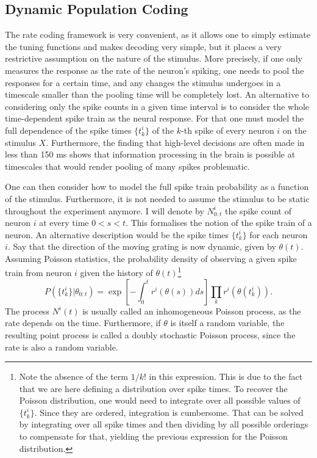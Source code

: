 \subsection{Dynamic Population Coding}

The rate coding framework is very convenient, as it allows one to simply estimate the tuning functions and makes decoding very simple, but it places a very restrictive
assumption on the nature of the stimulus. More precisely, if one only measures the response as the rate of the neuron's spiking, one needs to pool the responses for a 
certain time, and any changes the stimulus undergoes in a timescale smaller than the pooling time will be completely lost. An alternative to considering only the spike counts
in a given time interval is to consider the whole time-dependent spike train as the neural response. For that one must model the full dependence
of the spike times $\{t^i_k\}$ of the $k$-th spike of every neuron $i$ on the stimulus $X$. Furthermore, the finding that high-level decisions are often made in less than 
150 ms shows that information processing in the brain is possible at timescales that would render pooling of many spikes problematic.
\par

One can then consider how to model the full spike train probability as a function of the stimulus. Furthermore, it is not needed to assume the stimulus to be static
throughout the experiment anymore. I will denote by $N^i_{0:t}$ the spike count of neuron $i$ at every time $0 < s < t $. This formalises the notion of the spike train
of a neuron. An alternative description would be the spike times $\{t^i_k\}$ for each neuron $i$. Say that the direction of the moving grating is now dynamic, given
by $\theta(t)$. Assuming Poisson statistics, the probability density of observing a given spike train from neuron $i$ given the history of $\theta(t)$\footnote{Note the
absence of the term $1/k!$ in this expression. This is due to the fact that we are here defining a distribution over spike times. To recover the Poisson distribution, one
would need to integrate over all possible values of $\{t^i_k\}$. Since they are ordered, integration is cumbersome. That can be solved by integrating over all spike times
and then dividing by all possible orderings to compensate for that, yielding the previous expression for the Poisson distribution.}
\begin{equation}
\label{eq:poisson_prob}
P\left(\{t^i_k\}|\theta_{0:t}\right) = \exp\left[-\int_0^t r^i\left(\theta(s)\right) ds\right] \prod_k r^i\left(\theta(t^i_k)\right).
\end{equation}
The process $N^i(t)$ is usually called an inhomogeneous Poisson process, as the rate depends on the time. Furthermore, if $\theta$ is itself a random variable, the
resulting point process is called a doubly stochastic Poisson process, since the rate is also a random variable.\par


